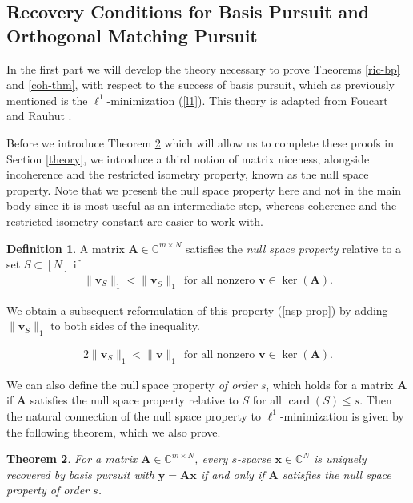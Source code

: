 \documentclass[12pt,a4paper]{amsart}
\numberwithin{equation}{section}
\theoremstyle{plain}
\newtheorem{Th}{Theorem}[section]
\theoremstyle{definition}
\newtheorem{Def}[Th]{Definition}
\newcommand{\BC}{\mathbb C}
\newcommand{\bdy}{\mathbf{y}}
\newcommand{\bdx}{\mathbf{x}}
\newcommand{\bdv}{\mathbf{v}}
\newcommand{\bdA}{\mathbf{A}}
\DeclareMathOperator{\card}{card}
\begin{document}
\begin{appendices}

\section{Recovery Conditions for Basis Pursuit and Orthogonal Matching Pursuit}\label{bp-omp-conds}

In the first part we will develop the theory necessary to prove Theorems \ref{ric-bp} and \ref{coh-thm}, with respect to the success of basis pursuit, which as previously mentioned is the $\ell^1$-minimization (\ref{l1}). This theory is adapted from Foucart and Rauhut \cite{fou-rau}.

Before we introduce Theorem \ref{bp-cond} which will allow us to complete these proofs in Section \ref{theory}, we introduce a third notion of matrix niceness, alongside incoherence and the restricted isometry property, known as the null space property. Note that we present the null space property here and not in the main body since it is most useful as an intermediate step, whereas coherence and the restricted isometry constant are easier to work with.

\begin{Def}\label{nsp} A matrix $\bdA\in\BC^{m\times N}$ satisfies the \textit{null space property} relative to a set $S\subset[N]$ if
\begin{align}\label{nsp-prop}
    \|\bdv_S\|_1<\|\bdv_{\bar S}\|_1 \ \ \text{for all nonzero } \bdv\in\ker(\bdA).
\end{align}
\end{Def}

We obtain a subsequent reformulation of this property (\ref{nsp-prop}) by adding $\|\bdv_S\|_1$ to both sides of the inequality.

\begin{align}\label{nsp-ref}
    2\|\bdv_S\|_1<\|\bdv\|_1 \ \ \text{for all nonzero }\bdv\in\ker(\bdA).
\end{align}

We can also define the null space property \textit{of order} $s$, which holds for a matrix $\bdA$ if $\bdA$ satisfies the null space property relative to $S$ for all $\card(S)\leq s$. Then the natural connection of the null space property to $\ell^1$-minimization is given by the following theorem, which we also prove.

\begin{Th}\label{bp-cond} For a matrix $\bdA\in\BC^{m\times N}$, every $s$-sparse $\bdx\in\BC^N$ is uniquely recovered by basis pursuit with $\bdy=\bdA\bdx$ if and only if $\bdA$ satisfies the null space property of order $s$.


\end{Th}
\end{appendices}
\end{document}
